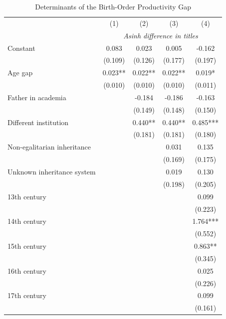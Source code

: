 \begin{table}[H]
\centering
\caption{Determinants of the Birth-Order Productivity Gap}
\label{tab:main_regressions}

\begin{tablebody}
\begin{tabular}{l c c c c}
\toprule
 & (1) & (2) & (3) & (4)\\
 & \multicolumn{4}{c}{\textit{Asinh difference in titles}} \\
\midrule

Constant
& 0.083
& 0.023
& 0.005
& -0.162 \\
& (0.109)
& (0.126)
& (0.177)
& (0.197) \\

Age gap 
& 0.023** & 0.022** & 0.022** & 0.019* \\
& (0.010) & (0.010) & (0.010) & (0.011) \\

Father in academia 
&  & -0.184 & -0.186 & -0.163 \\
&  & (0.149) & (0.148) & (0.150) \\

Different institution 
&  & 0.440** & 0.440** & 0.485*** \\
&  & (0.181) & (0.181) & (0.180) \\

Non-egalitarian inheritance 
&  &  & 0.031 & 0.135 \\
&  &  & (0.169) & (0.175) \\

Unknown inheritance system
&  &  & 0.019 & 0.130 \\
&  &  & (0.198) & (0.205) \\

13th century
& & & & 0.099 \\
& & & & (0.223) \\

14th century
& & & & 1.764*** \\
& & & & (0.552) \\

15th century
& & & & 0.863** \\
& & & & (0.345) \\

16th century
& & & & 0.025 \\
& & & & (0.226) \\

17th century
& & & & 0.099 \\
& & & & (0.161) \\


\end{tabular}
\end{tablebody}
\end{table}
